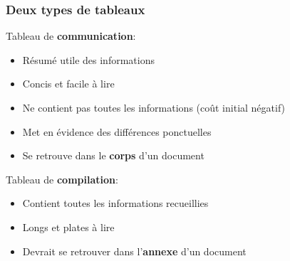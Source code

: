 \documentclass[aspectratio=169]{beamer}
\begin{document}
\begin{frame}[c]\frametitle{Deux types de tableaux}

\vspace{-3mm}

Tableau de \textbf{communication}:\vspace{-\parskip}
\begin{itemize}
	\item Résumé utile des informations
	\item Concis et facile à lire
	\item Ne contient pas toutes les informations (coût initial négatif)
	\item Met en évidence des différences ponctuelles
	\item Se retrouve dans le \textbf{corps} d'un document
\end{itemize}

Tableau de \textbf{compilation}:\vspace{-\parskip}
\begin{itemize}
	\item Contient toutes les informations recueillies
	\item Longs et plates à lire
	\item Devrait se retrouver dans l'\textbf{annexe} d'un document
\end{itemize}

\end{frame}
\end{document}
